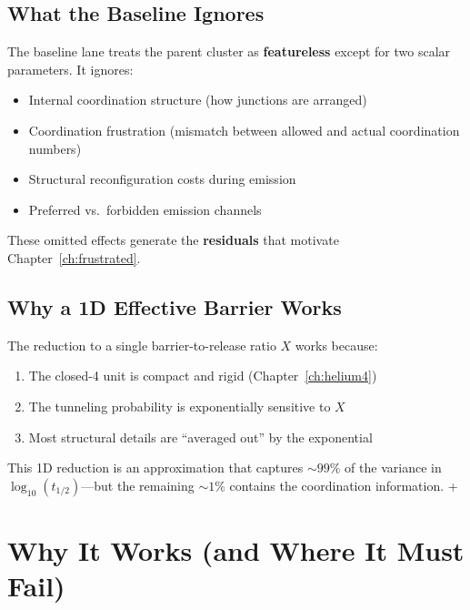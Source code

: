 \subsection{What the Baseline Ignores}

The baseline lane treats the parent cluster as \textbf{featureless} except
for two scalar parameters. It ignores:

\begin{itemize}
    \item Internal coordination structure (how junctions are arranged)
    \item Coordination frustration (mismatch between allowed and actual
          coordination numbers)
    \item Structural reconfiguration costs during emission
    \item Preferred vs.\ forbidden emission channels
\end{itemize}

These omitted effects generate the \textbf{residuals} that motivate
Chapter~\ref{ch:frustrated}. \tagP

\subsection{Why a 1D Effective Barrier Works}

The reduction to a single barrier-to-release ratio $X$ works because:

\begin{enumerate}
    \item The closed-4 unit is compact and rigid (Chapter~\ref{ch:helium4})
    \item The tunneling probability is exponentially sensitive to $X$
    \item Most structural details are ``averaged out'' by the exponential
\end{enumerate}

This 1D reduction is an approximation that captures $\sim 99\%$ of the
variance in $\log_{10}(t_{1/2})$---but the remaining $\sim 1\%$ contains
the coordination information. \tagP + \tagBL

\section{Why It Works (and Where It Must Fail)}
\label{sec:gn:failure}

